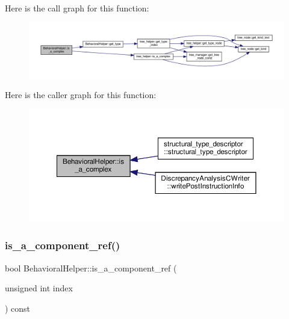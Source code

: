 Here is the call graph for this function\+:
\nopagebreak
\begin{figure}[H]
\begin{center}
\leavevmode
\includegraphics[width=350pt]{dd/db2/classBehavioralHelper_a7429077b95289a4988649bc8cc58ae06_cgraph}
\end{center}
\end{figure}
Here is the caller graph for this function\+:
\nopagebreak
\begin{figure}[H]
\begin{center}
\leavevmode
\includegraphics[width=350pt]{dd/db2/classBehavioralHelper_a7429077b95289a4988649bc8cc58ae06_icgraph}
\end{center}
\end{figure}
\mbox{\label{classBehavioralHelper_a4f81293e41ce4964ead8957f6bc4879e}} 
\subsubsection{\texorpdfstring{is\+\_\+a\+\_\+component\+\_\+ref()}{is\_a\_component\_ref()}}
{\footnotesize\ttfamily bool Behavioral\+Helper\+::is\+\_\+a\+\_\+component\+\_\+ref (\begin{DoxyParamCaption}\item[{unsigned int}]{index }\end{DoxyParamCaption}) const\hspace{0.3cm}{\ttfamily [virtual]}}



